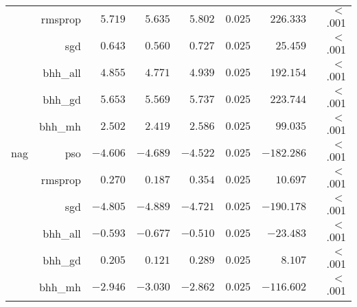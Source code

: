 \begin{table}[htb]
{\begin{tabular}{lrrrrrrr}
			                     & rmsprop              & $5.719$              & $5.635$                                         & $5.802$              & $0.025$              & $226.333$            & $<$ .001    \\
			                     & sgd                  & $0.643$              & $0.560$                                         & $0.727$              & $0.025$              & $25.459$             & $<$ .001    \\
			                     & bhh\_all             & $4.855$              & $4.771$                                         & $4.939$              & $0.025$              & $192.154$            & $<$ .001    \\
			                     & bhh\_gd              & $5.653$              & $5.569$                                         & $5.737$              & $0.025$              & $223.744$            & $<$ .001    \\
			                     & bhh\_mh              & $2.502$              & $2.419$                                         & $2.586$              & $0.025$              & $99.035$             & $<$ .001    \\
			nag                  & pso                  & $-4.606$             & $-4.689$                                        & $-4.522$             & $0.025$              & $-182.286$           & $<$ .001    \\
			$ $                  & rmsprop              & $0.270$              & $0.187$                                         & $0.354$              & $0.025$              & $10.697$             & $<$ .001    \\
			                     & sgd                  & $-4.805$             & $-4.889$                                        & $-4.721$             & $0.025$              & $-190.178$           & $<$ .001    \\
			                     & bhh\_all             & $-0.593$             & $-0.677$                                        & $-0.510$             & $0.025$              & $-23.483$            & $<$ .001    \\
			                     & bhh\_gd              & $0.205$              & $0.121$                                         & $0.289$              & $0.025$              & $8.107$              & $<$ .001    \\
			                     & bhh\_mh              & $-2.946$             & $-3.030$                                        & $-2.862$             & $0.025$              & $-116.602$           & $<$ .001    \\

\end{tabular}}
\end{table}
